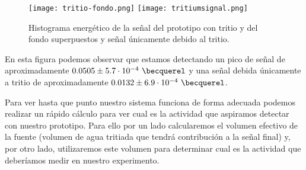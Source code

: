 \begin{figure}[htb]
\centering
{
\texttt{[image: tritio-fondo.png]} 
}
{
\texttt{[image: tritiumsignal.png]} 
}
\caption{Histograma energético de la señal del prototipo con tritio y del fondo superpuestos y señal únicamente debido al tritio.\label{senaltritio}}
\end{figure}


En esta figura podemos observar que estamos detectando un pico de señal de aproximadamente $0.0505 \pm 5.7 \cdot 10^{-4}~\becquerel$ y una señal debida únicamente a tritio de aproximadamente $0.0132 \pm 6.9 \cdot 10^{-4}~\becquerel$. 

Para ver hasta que punto nuestro sistema funciona de forma adecuada podemos realizar un rápido cálculo para ver cual es la actividad que aspiramos detectar con nuestro prototipo. Para ello por un lado calcularemos el volumen efectivo de la fuente (volumen de agua tritiada que tendrá contribución a la señal final) y, por otro lado, utilizaremos este volumen para determinar cual es la actividad que deberíamos medir en nuestro experimento.


